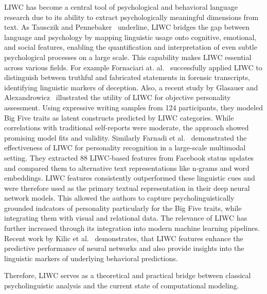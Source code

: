 LIWC has become a central tool of psychological and behavioral language research due to its ability to extract psychologically meaningful dimensions from text. As Tausczik and Pennebaker~\cite{tausczik2010psychological} underline, LIWC bridges the gap between language and psychology by mapping linguistic usage onto cognitive, emotional, and social features, enabling the quantification and interpretation of even subtle psychological processes on a large scale. This capability makes LIWC essential across various fields. For example Fornaciari at. al.~\cite{fornaciari2013automatic} successfully applied LIWC to distinguish between truthful and fabricated statements in forensic transcripts, identifying linguistic markers of deception. Also, a recent study by Glasauer and Alexandrowicz~\cite{glasauer2022bigfive} illustrated the utility of LIWC for objective personality assessment. Using expressive writing samples from 124 participants, they modeled Big Five traits as latent constructs predicted by LIWC categories. While correlations with traditional self-reports were moderate, the approach showed promising model fits and validity. Similarly Farnadi et al.~\cite{farnadi2018user} demonstrated the effectiveness of LIWC for personality recognition in a large-scale multimodal setting. They extracted 88 LIWC-based features from Facebook status updates and compared them to alternative text representations like n-grams and word embeddings. LIWC features consistently outperformed these linguistic cues and were therefore used as the primary textual representation in their deep neural network models. This allowed the authors to capture psycholinguistically grounded indcators of personality particularly for the Big Five traits, while integrating them with visual and relational data. The relevance of LIWC has further increased through its integration into modern machine learning pipelines. Recent work by Kilic et al.~\cite{yakut-kilic-pan-2022-incorporating} demonstrates, that LIWC features enhance the predictive performance of neural networks and also provide insights into the linguistic markers of underlying behavioral predictions.

Therefore, LIWC serves as a theoretical and practical bridge between classical psycholinguistic analysis and the current state of computational modeling. 



